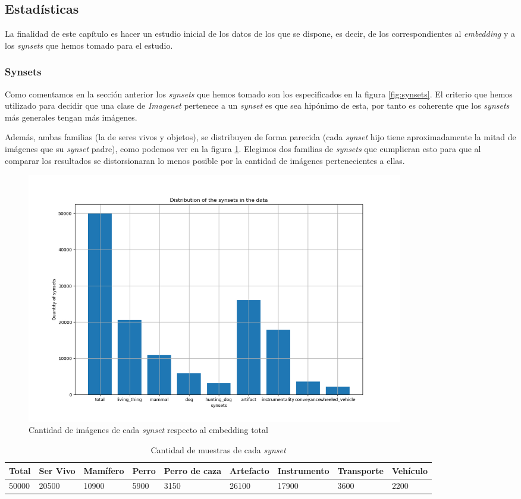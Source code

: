 \documentclass[12,twoside]{TFG-GM}
\theoremstyle{definition}
\theoremstyle{remark}
\begin{document}
\subsection{Estadísticas}\label{se:stats}
La finalidad de este capítulo es hacer un estudio inicial de los datos de los que se dispone, es decir, de los correspondientes al \textit{embedding} y a los \textit{synsets} que hemos tomado para el estudio. 

\subsubsection{Synsets}

Como comentamos en la sección anterior los \textit{synsets} que hemos tomado son los especificados en la figura \ref{fig:synsets}. 
El criterio que hemos utilizado para decidir que una clase de \textit{Imagenet} pertenece a un \textit{synset} es que sea hipónimo de esta, por tanto es coherente que los \textit{synsets} más generales tengan más imágenes. 
 
Además, ambas familias (la de seres vivos y objetos), se distribuyen de forma parecida (cada \textit{synset} hijo tiene aproximadamente la mitad de imágenes que su \textit{synset} padre), como podemos ver en la figura \ref{fig:totalsynsets}. Elegimos dos familias de \textit{synsets} que cumplieran esto para que al comparar los resultados se distorsionaran lo menos posible por la cantidad de imágenes pertenecientes a ellas.

\begin{figure}[H] 
	\centering
	\includegraphics[width=0.8\textwidth] {Images/plots/25/distribution_of_synsets_bar.png}
	\caption{ Cantidad de imágenes de cada \textit{synset} respecto al embedding total
	\label{fig:totalsynsets}}
\end{figure}


\begin{table}[]
\centering
\caption{Cantidad de muestras de cada \textit{synset}}
\label{table:distributionsynsets}
\begin{tabular}{|l|l|l|l|l|l|l|l|l|}
\hline
Total & Ser Vivo & Mamífero & Perro & Perro de caza & Artefacto & Instrumento & Transporte & Vehículo \\ \hline
50000 & 20500    & 10900    & 5900  & 3150          & 26100     & 17900       & 3600       & 2200     \\ \hline
\end{tabular}
\end{table}
\end{document}
